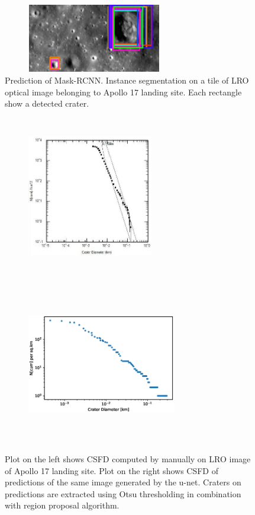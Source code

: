 \documentclass[11pt]{article}
\begin{document}
\begin{figure}[H]
	\centering
	\includegraphics[width=8cm, height=3cm]{files/results/mask.png}
	\caption{Prediction of Mask-RCNN. Instance segmentation on a tile of LRO optical image belonging to Apollo 17 landing site. Each rectangle show a detected crater.}
	\label{mask_rcnn}
\end{figure}

\begin{figure}[H]
	\begin{subfigure}{7cm}
		\centering\includegraphics[width=5.5cm, height=7cm]{files/results/dino_csfd.jpg}\hfill
	\end{subfigure}
	\begin{subfigure}{7cm}
		\centering\includegraphics[width=6.5cm, height=7cm]{files/results/csfd.eps}

	\end{subfigure}
		\caption{Plot on the left shows CSFD computed by \cite{dino2020} manually on LRO image of Apollo 17 landing site. Plot on the right shows CSFD of predictions of the same image generated by the u-net. Craters on predictions are extracted using Otsu thresholding in combination with region proposal algorithm.}
\end{figure}
\end{document}
